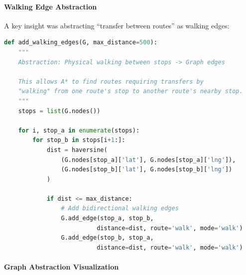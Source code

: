 \paragraph{Walking Edge Abstraction}

A key insight was abstracting ``transfer between routes'' as walking edges:

\begin{lstlisting}[language=Python, caption={Walking Edge Abstraction for Transfers}]
def add_walking_edges(G, max_distance=500):
    """
    Abstraction: Physical walking between stops -> Graph edges
    
    This allows A* to find routes requiring transfers by
    "walking" from one route's stop to another route's nearby stop.
    """
    stops = list(G.nodes())
    
    for i, stop_a in enumerate(stops):
        for stop_b in stops[i+1:]:
            dist = haversine(
                (G.nodes[stop_a]['lat'], G.nodes[stop_a]['lng']),
                (G.nodes[stop_b]['lat'], G.nodes[stop_b]['lng'])
            )
            
            if dist <= max_distance:
                # Add bidirectional walking edges
                G.add_edge(stop_a, stop_b, 
                          distance=dist, route='walk', mode='walk')
                G.add_edge(stop_b, stop_a, 
                          distance=dist, route='walk', mode='walk')
\end{lstlisting}

\paragraph{Graph Abstraction Visualization}

